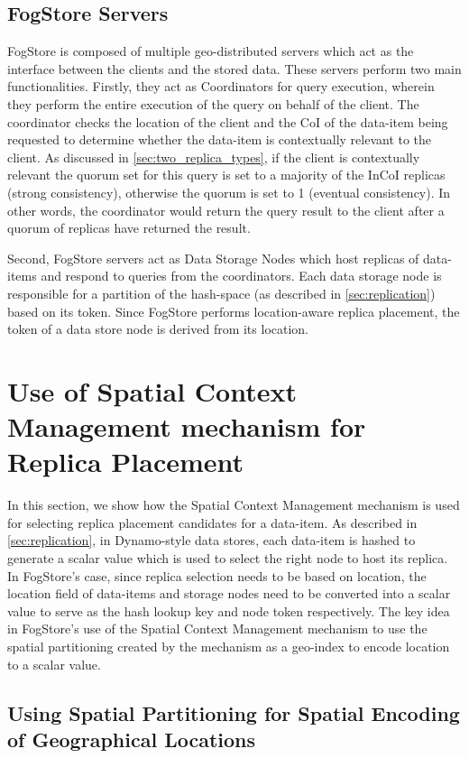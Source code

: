 \subsection{FogStore Servers}
FogStore is composed of multiple geo-distributed servers which act as the interface between the clients and the stored data. These servers perform two main functionalities. Firstly, they act as Coordinators for query execution, wherein they perform  the entire execution of the query on behalf of the client. The coordinator checks the location of the client and the CoI of the data-item being requested to determine whether the data-item is contextually relevant to the client. As discussed in \cref{sec:two_replica_types}, if the client is contextually relevant the quorum set for this query is set to a majority of the InCoI replicas (strong consistency), otherwise the quorum is set to 1 (eventual consistency). In other words, the coordinator would return the query result to the client after a quorum of replicas have returned the result.
\par Second, FogStore servers act as Data Storage Nodes which host replicas of data-items and respond to queries from the coordinators. Each data storage node is responsible for a partition of the hash-space (as described in \cref{sec:replication}) based on its token. Since FogStore performs location-aware replica placement, the token of a data store node is derived from its location.

\section{Use of Spatial Context Management mechanism for Replica Placement}
\label{sec:replica_placement}
In this section, we show how the Spatial Context Management mechanism is used for selecting replica placement candidates for a data-item. As described in \cref{sec:replication}, in Dynamo-style data stores, each data-item is hashed to generate a scalar value which is used to select the right node to host its replica. In FogStore's case, since replica selection needs to be based on location, the location field of data-items and storage nodes need to be converted into a scalar value to serve as the hash lookup key and node token respectively. The key idea in FogStore's use of the Spatial Context Management mechanism to use the spatial partitioning created by the mechanism as a geo-index to encode location to a scalar value.

\subsection{Using Spatial Partitioning for Spatial Encoding of Geographical Locations}
\label{sec:geoindexing}

